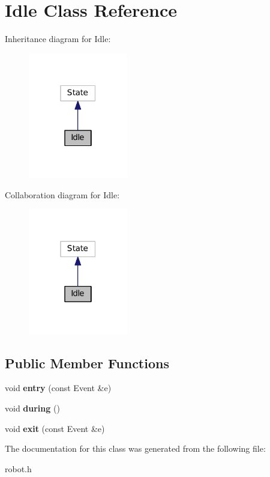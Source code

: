 \hypertarget{classIdle}{\section{Idle Class Reference}
\label{classIdle}
}


Inheritance diagram for Idle\+:
\nopagebreak
\begin{figure}[H]
\begin{center}
\leavevmode
\includegraphics[width=123pt]{classIdle__inherit__graph}
\end{center}
\end{figure}


Collaboration diagram for Idle\+:
\nopagebreak
\begin{figure}[H]
\begin{center}
\leavevmode
\includegraphics[width=123pt]{classIdle__coll__graph}
\end{center}
\end{figure}
\subsection*{Public Member Functions}
\begin{DoxyCompactItemize}
\item 
\hypertarget{classIdle_abe8c7b8e0551be3c8f055330d256e365}{void {\bfseries entry} (const Event \&e)}\label{classIdle_abe8c7b8e0551be3c8f055330d256e365}

\item 
\hypertarget{classIdle_a68789ed7b16a10ac60a7e1bc44745476}{void {\bfseries during} ()}\label{classIdle_a68789ed7b16a10ac60a7e1bc44745476}

\item 
\hypertarget{classIdle_aaecc780082c26be016105ec98c44a3c6}{void {\bfseries exit} (const Event \&e)}\label{classIdle_aaecc780082c26be016105ec98c44a3c6}

\end{DoxyCompactItemize}


The documentation for this class was generated from the following file\+:\begin{DoxyCompactItemize}
\item 
robot.\+h\end{DoxyCompactItemize}
